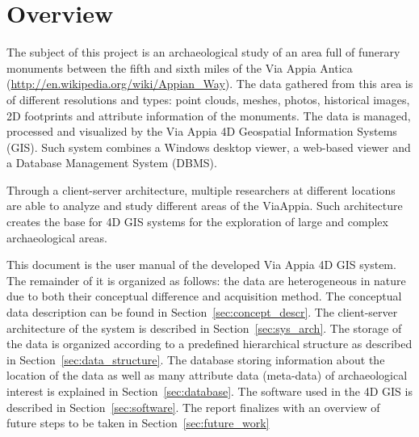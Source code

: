 \section{Overview}
\label{sec:dataman_overview}

The subject of this project is an archaeological study of an area full of
funerary monuments between the fifth and sixth miles of the Via Appia
Antica ({\url{http://en.wikipedia.org/wiki/Appian_Way}}).
The data gathered from this area is of different resolutions and types: point clouds, meshes, photos, historical images, 2D footprints and
attribute information of the monuments. The data is managed,
processed and visualized by the Via Appia 4D Geospatial Information Systems (GIS).
Such system combines a Windows desktop viewer, a web-based viewer and a Database Management System (DBMS).

Through a client-server architecture, multiple researchers at different locations
are able to analyze and study different areas of the ViaAppia. Such architecture creates the base for 4D GIS systems for the exploration of large and complex
archaeological areas.

This document is the user manual of the developed Via Appia 4D GIS system. The remainder of it is organized as follows: the data are heterogeneous in nature due to both their conceptual difference and acquisition method. The conceptual data description can be found in Section~\ref{sec:concept_descr}. The client-server architecture of the system is described in Section~\ref{sec:sys_arch}. The storage of the data is
organized according to a predefined hierarchical structure as described in
Section~\ref{sec:data_structure}. The database storing information about the location  of the data as
well as many attribute data (meta-data) of archaeological interest is
explained in Section~\ref{sec:database}. The software used in the 4D GIS is
described in Section~\ref{sec:software}. The report finalizes with an overview
of future steps to be taken in Section~\ref{sec:future_work}
